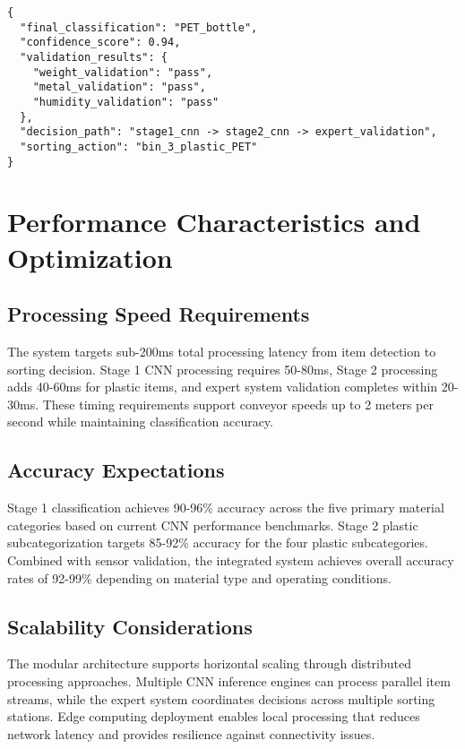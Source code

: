 \documentclass[11pt, a4paper]{article}
\begin{document}
\begin{lstlisting}[style=jsonstyle, caption=Example Expert System Output JSON]
{
  "final_classification": "PET_bottle",
  "confidence_score": 0.94,
  "validation_results": {
    "weight_validation": "pass",
    "metal_validation": "pass", 
    "humidity_validation": "pass"
  },
  "decision_path": "stage1_cnn -> stage2_cnn -> expert_validation",
  "sorting_action": "bin_3_plastic_PET"
}
\end{lstlisting}

\section{Performance Characteristics and Optimization}

\subsection{Processing Speed Requirements}
The system targets sub-200ms total processing latency from item detection to sorting decision. Stage 1 CNN processing requires 50-80ms, Stage 2 processing adds 40-60ms for plastic items, and expert system validation completes within 20-30ms. These timing requirements support conveyor speeds up to 2 meters per second while maintaining classification accuracy.

\subsection{Accuracy Expectations}
Stage 1 classification achieves 90-96\% accuracy across the five primary material categories based on current CNN performance benchmarks. Stage 2 plastic subcategorization targets 85-92\% accuracy for the four plastic subcategories. Combined with sensor validation, the integrated system achieves overall accuracy rates of 92-99\% depending on material type and operating conditions.

\subsection{Scalability Considerations}
The modular architecture supports horizontal scaling through distributed processing approaches. Multiple CNN inference engines can process parallel item streams, while the expert system coordinates decisions across multiple sorting stations. Edge computing deployment enables local processing that reduces network latency and provides resilience against connectivity issues.
\end{document}
